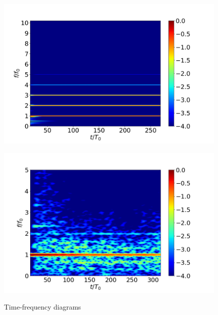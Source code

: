 \documentclass[a4wide,fontsize=12pt]{article}
\begin{document}


\begin{figure}
\centering
    \begin{minipage}[t]{0.45\textwidth}
        \centering
        \includegraphics[width=1.15\textwidth]{Figs/TFBG14.png}
        \label{fig:tfd11}
    \end{minipage}
    \begin{minipage}[t]{0.45\textwidth}
        \centering
        \includegraphics[width=1.15\textwidth]{Figs/TFD_pos34693_nperseg400_to0T.png}
        \label{fig:tfdX}
    \end{minipage}
    \caption{Time-frequency diagrams}
\end{figure}
\end{document}
